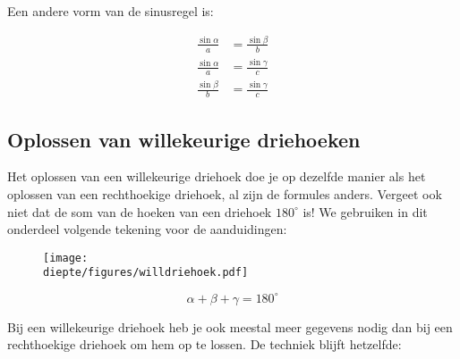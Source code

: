 \documentclass[a4paper,12pt]{article}
\newcommand{\diepte}{./}
\begin{document}
Een andere vorm van de sinusregel is:

\begin{framed}
\begin{align*}
\frac{\sin \alpha}{a} &= \frac{\sin \beta}{b}\\
\frac{\sin \alpha}{a} &= \frac{\sin \gamma}{c}\\
\frac{\sin \beta}{b} &= \frac{\sin \gamma}{c}
\end{align*}
\end{framed}

\subsection{Oplossen van willekeurige driehoeken}

Het oplossen van een willekeurige driehoek doe je op dezelfde manier als het oplossen van een rechthoekige driehoek, al zijn de formules anders.  Vergeet ook niet dat de som van de hoeken van een driehoek $180^\circ$ is! We gebruiken in dit onderdeel volgende tekening voor de aanduidingen:

\begin{figure}[h]
\begin{center}
\texttt{[image: \\diepte/figures/willdriehoek.pdf]}
\end{center}
\end{figure}

\begin{framed}
\[\alpha + \beta + \gamma = 180^\circ\]
\end{framed}

Bij een willekeurige driehoek heb je ook meestal meer gegevens nodig dan bij een rechthoekige driehoek om hem op te lossen.  De techniek blijft hetzelfde:
\begin{framed}
\begin{center}
\end{center}
\end{framed}
\end{document}
